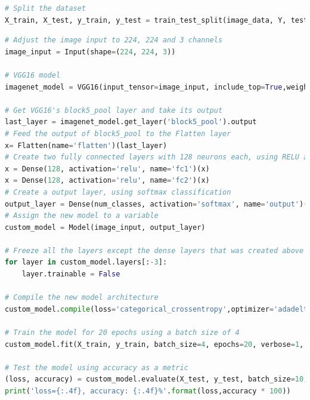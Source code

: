 \begin{lstlisting}[frame=single, language=Python, label={code:shuffle_and_split_data}, caption={Code to shuffle and split the data to 80\% training and 20\% test.}]
# Split the dataset
X_train, X_test, y_train, y_test = train_test_split(image_data, Y, test_size=0.2, random_state=2)
\end{lstlisting} 

\begin{lstlisting}[frame=single, language=Python, label={code:model_creation_and_training}, caption={Code to load VGG16 pre-trained on ImageNet and doing transfer learning.}]
# Adjust the image input to 224, 224 and 3 channels
image_input = Input(shape=(224, 224, 3))

# VGG16 model
imagenet_model = VGG16(input_tensor=image_input, include_top=True,weights='imagenet')

# Get VGG16's block5_pool layer and take its output
last_layer = imagenet_model.get_layer('block5_pool').output
# Feed the output of block5_pool to the Flatten layer
x= Flatten(name='flatten')(last_layer)
# Create two fully connected layers with 128 neurons each, using RELU activation
x = Dense(128, activation='relu', name='fc1')(x)
x = Dense(128, activation='relu', name='fc2')(x)
# Create a output layer, using softmax classification
output_layer = Dense(num_classes, activation='softmax', name='output')(x)
# Assign the new model to a variable
custom_model = Model(image_input, output_layer)

# Freeze all the layers except the dense layers that was created above
for layer in custom_model.layers[:-3]:
	layer.trainable = False

# Compile the new model architecture
custom_model.compile(loss='categorical_crossentropy',optimizer='adadelta',metrics=['accuracy'])

# Train the model for 20 epochs using a batch size of 4
custom_model.fit(X_train, y_train, batch_size=4, epochs=20, verbose=1, validation_data=(X_test, y_test))

# Test the model using accuracy as a metric
(loss, accuracy) = custom_model.evaluate(X_test, y_test, batch_size=10, verbose=1)
print('loss={:.4f}, accuracy: {:.4f}%'.format(loss,accuracy * 100))
\end{lstlisting}



